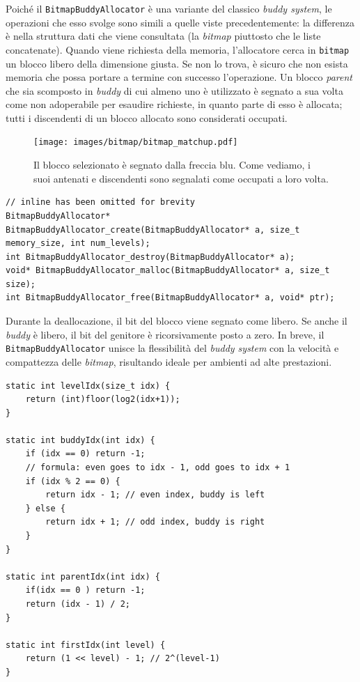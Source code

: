 Poiché il \texttt{BitmapBuddyAllocator} è una variante del classico \textit{buddy system}, le operazioni che esso svolge sono simili a quelle viste precedentemente: la differenza è nella struttura dati che viene consultata (la \textit{bitmap} piuttosto che le liste concatenate). Quando viene richiesta della memoria, l’allocatore cerca in \texttt{bitmap} un blocco libero della dimensione giusta. Se non lo trova, è sicuro che non esista memoria che possa portare a termine con successo l'operazione. Un blocco \textit{parent} che sia scomposto in \textit{buddy} di cui almeno uno è utilizzato è segnato a sua volta come non adoperabile per esaudire richieste, in quanto parte di esso è allocata; tutti i discendenti di un blocco allocato sono considerati occupati.

\begin{figure}[H]
    \centering
    \texttt{[image: images/bitmap/bitmap\_matchup.pdf]}
    \caption{Il blocco selezionato è segnato dalla freccia blu. Come vediamo, i suoi antenati e discendenti sono segnalati come occupati a loro volta.}
    \label{fig:bitmap_matchup}
\end{figure}


\begin{lstlisting}
// inline has been omitted for brevity
BitmapBuddyAllocator* BitmapBuddyAllocator_create(BitmapBuddyAllocator* a, size_t memory_size, int num_levels);
int BitmapBuddyAllocator_destroy(BitmapBuddyAllocator* a);
void* BitmapBuddyAllocator_malloc(BitmapBuddyAllocator* a, size_t size);
int BitmapBuddyAllocator_free(BitmapBuddyAllocator* a, void* ptr);
\end{lstlisting}

Durante la deallocazione, il bit del blocco viene segnato come libero. Se anche il \textit{buddy} è libero, il bit del genitore è ricorsivamente posto a zero. In breve, il \texttt{BitmapBuddyAllocator} unisce la flessibilità del \textit{buddy system} con la velocità e compattezza delle \textit{bitmap}, risultando ideale per ambienti ad alte prestazioni.

\begin{lstlisting}
static int levelIdx(size_t idx) {
    return (int)floor(log2(idx+1));
}

static int buddyIdx(int idx) {
    if (idx == 0) return -1;
    // formula: even goes to idx - 1, odd goes to idx + 1
    if (idx % 2 == 0) {
        return idx - 1; // even index, buddy is left
    } else {
        return idx + 1; // odd index, buddy is right
    }
}

static int parentIdx(int idx) {
    if(idx == 0 ) return -1;
    return (idx - 1) / 2;
}

static int firstIdx(int level) {
    return (1 << level) - 1; // 2^(level-1)
}
\end{lstlisting}

